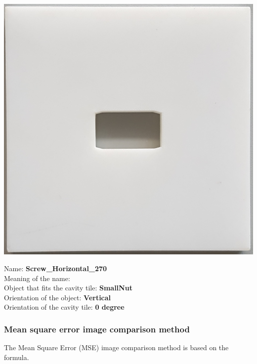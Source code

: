 \documentclass{article}
\begin{document}
\begin{minipage}[b]{0.35\linewidth}

\begin{center}
\includegraphics[height=5\baselineskip]{images/SmallNut_Vertical_00.jpg}
\end{center}

\end{minipage}
\begin{minipage}[b]{0.65\linewidth}
\begin{flushleft}
Name: \textbf{Screw\_Horizontal\_270} \\ 
Meaning of the name: \\ 
Object that fits the cavity tile: \textbf{SmallNut} \\
Orientation of the object: \textbf{Vertical} \\
Orientation of the cavity tile:\textbf{ 0 degree}
\end{flushleft}

\end{minipage}



\subsubsection*{Mean square error image comparison method}
 The Mean Square Error (MSE) image comparison method is based on the formula. \\
 
\end{document}
